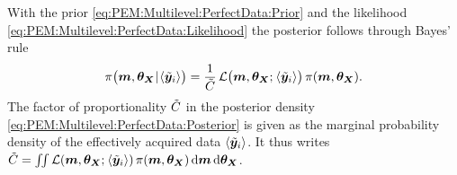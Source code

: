 With the prior \cref{eq:PEM:Multilevel:PerfectData:Prior} and the likelihood \cref{eq:PEM:Multilevel:PerfectData:Likelihood} the posterior follows through Bayes' rule
\begin{equation} \label{eq:PEM:Multilevel:PerfectData:Posterior}
  \pi \big( \bm{m},\bm{\theta}_{\bm{X}} {\:\!}|{\:\!} \langle{\tilde{\bm{y}}_i}\rangle \big)
  = \frac{1}{\tilde{C}} \, \mathcal{L} \big( \bm{m},\bm{\theta}_{\bm{X}} ;{\:\!} \langle{\tilde{\bm{y}}_i}\rangle \big) \, \pi(\bm{m},\bm{\theta}_{\bm{X}}).
\end{equation}
The factor of proportionality \(\tilde{C}\) in the posterior density \cref{eq:PEM:Multilevel:PerfectData:Posterior} is given as the marginal probability density of the effectively acquired data \(\langle{\tilde{\bm{y}}_i}\rangle\).
It thus writes \(\tilde{C} = \iint \mathcal{L}(\bm{m},\bm{\theta}_{\bm{X}} ;{\:\!} \langle{\tilde{\bm{y}}_i}\rangle) \, \pi(\bm{m},\bm{\theta}_{\bm{X}}) \, \mathrm{d} \bm{m} \, \mathrm{d} \bm{\bm{\theta}_{\bm{X}}}\).

